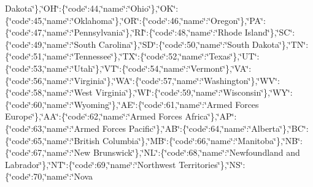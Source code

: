 {Dakota\char`\"{}\},\char`\"{}O\-H\char`\"{}\-:\{\char`\"{}code\char`\"{}\-:44,\char`\"{}name\char`\"{}\-:\char`\"{}Ohio\char`\"{}\},\char`\"{}O\-K\char`\"{}\-:\{\char`\"{}code\char`\"{}\-:45,\char`\"{}name\char`\"{}\-:\char`\"{}Oklahoma\char`\"{}\},\char`\"{}O\-R\char`\"{}\-:\{\char`\"{}code\char`\"{}\-:46,\char`\"{}name\char`\"{}\-:\char`\"{}Oregon\char`\"{}\},\char`\"{}P\-A\char`\"{}\-:\{\char`\"{}code\char`\"{}\-:47,\char`\"{}name\char`\"{}\-:\char`\"{}Pennsylvania\char`\"{}\},\char`\"{}R\-I\char`\"{}\-:\{\char`\"{}code\char`\"{}\-:48,\char`\"{}name\char`\"{}\-:\char`\"{}Rhode Island\char`\"{}\},\char`\"{}S\-C\char`\"{}\-:\{\char`\"{}code\char`\"{}\-:49,\char`\"{}name\char`\"{}\-:\char`\"{}South Carolina\char`\"{}\},\char`\"{}S\-D\char`\"{}\-:\{\char`\"{}code\char`\"{}\-:50,\char`\"{}name\char`\"{}\-:\char`\"{}South Dakota\char`\"{}\},\char`\"{}T\-N\char`\"{}\-:\{\char`\"{}code\char`\"{}\-:51,\char`\"{}name\char`\"{}\-:\char`\"{}Tennessee\char`\"{}\},\char`\"{}T\-X\char`\"{}\-:\{\char`\"{}code\char`\"{}\-:52,\char`\"{}name\char`\"{}\-:\char`\"{}Texas\char`\"{}\},\char`\"{}U\-T\char`\"{}\-:\{\char`\"{}code\char`\"{}\-:53,\char`\"{}name\char`\"{}\-:\char`\"{}Utah\char`\"{}\},\char`\"{}V\-T\char`\"{}\-:\{\char`\"{}code\char`\"{}\-:54,\char`\"{}name\char`\"{}\-:\char`\"{}Vermont\char`\"{}\},\char`\"{}V\-A\char`\"{}\-:\{\char`\"{}code\char`\"{}\-:56,\char`\"{}name\char`\"{}\-:\char`\"{}Virginia\char`\"{}\},\char`\"{}W\-A\char`\"{}\-:\{\char`\"{}code\char`\"{}\-:57,\char`\"{}name\char`\"{}\-:\char`\"{}Washington\char`\"{}\},\char`\"{}W\-V\char`\"{}\-:\{\char`\"{}code\char`\"{}\-:58,\char`\"{}name\char`\"{}\-:\char`\"{}West Virginia\char`\"{}\},\char`\"{}W\-I\char`\"{}\-:\{\char`\"{}code\char`\"{}\-:59,\char`\"{}name\char`\"{}\-:\char`\"{}Wisconsin\char`\"{}\},\char`\"{}W\-Y\char`\"{}\-:\{\char`\"{}code\char`\"{}\-:60,\char`\"{}name\char`\"{}\-:\char`\"{}Wyoming\char`\"{}\},\char`\"{}A\-E\char`\"{}\-:\{\char`\"{}code\char`\"{}\-:61,\char`\"{}name\char`\"{}\-:\char`\"{}Armed Forces Europe\char`\"{}\},\char`\"{}A\-A\char`\"{}\-:\{\char`\"{}code\char`\"{}\-:62,\char`\"{}name\char`\"{}\-:\char`\"{}Armed Forces Africa\char`\"{}\},\char`\"{}A\-P\char`\"{}\-:\{\char`\"{}code\char`\"{}\-:63,\char`\"{}name\char`\"{}\-:\char`\"{}Armed Forces Pacific\char`\"{}\},\char`\"{}A\-B\char`\"{}\-:\{\char`\"{}code\char`\"{}\-:64,\char`\"{}name\char`\"{}\-:\char`\"{}Alberta\char`\"{}\},\char`\"{}B\-C\char`\"{}\-:\{\char`\"{}code\char`\"{}\-:65,\char`\"{}name\char`\"{}\-:\char`\"{}British Columbia\char`\"{}\},\char`\"{}M\-B\char`\"{}\-:\{\char`\"{}code\char`\"{}\-:66,\char`\"{}name\char`\"{}\-:\char`\"{}Manitoba\char`\"{}\},\char`\"{}N\-B\char`\"{}\-:\{\char`\"{}code\char`\"{}\-:67,\char`\"{}name\char`\"{}\-:\char`\"{}New Brunswick\char`\"{}\},\char`\"{}N\-L\char`\"{}\-:\{\char`\"{}code\char`\"{}\-:68,\char`\"{}name\char`\"{}\-:\char`\"{}Newfoundland and Labrador\char`\"{}\},\char`\"{}N\-T\char`\"{}\-:\{\char`\"{}code\char`\"{}\-:69,\char`\"{}name\char`\"{}\-:\char`\"{}Northwest Territories\char`\"{}\},\char`\"{}N\-S\char`\"{}\-:\{\char`\"{}code\char`\"{}\-:70,\char`\"{}name\char`\"{}\-:\char`\"{}Nova }
